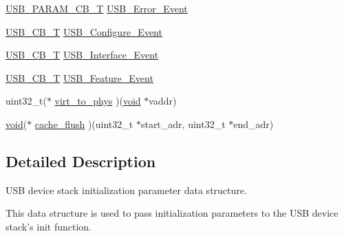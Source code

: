 \begin{DoxyCompactItemize}
\item 
\hyperlink{group__USBD__Core_ga7df622c61ebb152b83dd5972ac789b28}{U\-S\-B\-\_\-\-P\-A\-R\-A\-M\-\_\-\-C\-B\-\_\-\-T} \hyperlink{structUSBD__API__INIT__PARAM_aff13e98d564c8a0e2356e749a7f9b303}{U\-S\-B\-\_\-\-Error\-\_\-\-Event}
\item 
\hyperlink{group__USBD__Core_ga0404ce046312aa5c798cc4a05c417e46}{U\-S\-B\-\_\-\-C\-B\-\_\-\-T} \hyperlink{structUSBD__API__INIT__PARAM_ac78477c763bc96613ad5069c84ae3563}{U\-S\-B\-\_\-\-Configure\-\_\-\-Event}
\item 
\hyperlink{group__USBD__Core_ga0404ce046312aa5c798cc4a05c417e46}{U\-S\-B\-\_\-\-C\-B\-\_\-\-T} \hyperlink{structUSBD__API__INIT__PARAM_a8582d6606f3154437b513800a6bff4c9}{U\-S\-B\-\_\-\-Interface\-\_\-\-Event}
\item 
\hyperlink{group__USBD__Core_ga0404ce046312aa5c798cc4a05c417e46}{U\-S\-B\-\_\-\-C\-B\-\_\-\-T} \hyperlink{structUSBD__API__INIT__PARAM_a785b92610b9c3430e50123ffd8a0497b}{U\-S\-B\-\_\-\-Feature\-\_\-\-Event}
\item 
uint32\-\_\-t($\ast$ \hyperlink{structUSBD__API__INIT__PARAM_ab0a7aab4c6e5720243c0b7942bc5fefe}{virt\-\_\-to\-\_\-phys} )(\hyperlink{Paradigm_2Tern__EE_2small_2portmacro_8h_a14d32f8130d3c0b212cfc751730b5b49}{void} $\ast$vaddr)
\item 
\hyperlink{Paradigm_2Tern__EE_2small_2portmacro_8h_a14d32f8130d3c0b212cfc751730b5b49}{void}($\ast$ \hyperlink{structUSBD__API__INIT__PARAM_afb3e4b3d909cb45f0b6365e0ac8939b3}{cache\-\_\-flush} )(uint32\-\_\-t $\ast$start\-\_\-adr, uint32\-\_\-t $\ast$end\-\_\-adr)
\end{DoxyCompactItemize}


\subsection{Detailed Description}
U\-S\-B device stack initialization parameter data structure. 

This data structure is used to pass initialization parameters to the U\-S\-B device stack's init function. 

